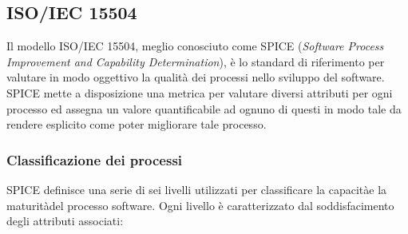 \subsection{ISO/IEC 15504}
Il modello ISO/IEC 15504, meglio conosciuto come SPICE (\textit{Software Process Improvement and Capability Determination}), è lo standard di riferimento per valutare in modo oggettivo la qualità dei processi nello sviluppo del software. \\
SPICE mette a disposizione una metrica per valutare diversi attributi per ogni processo ed
assegna un valore quantificabile ad ognuno di questi in modo tale da rendere esplicito come poter migliorare tale processo.

\subsubsection{Classificazione dei processi}
SPICE definisce una serie di sei livelli utilizzati per classificare la capacità\glo e la maturità\glo del processo software. Ogni livello è caratterizzato dal soddisfacimento degli attributi associati:
